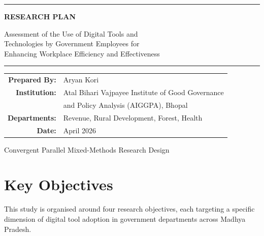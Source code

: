 \documentclass[12pt,a4paper]{article}
\begin{document}
\begin{titlepage}
\centering
\vspace*{3cm}

{\color{gold}\rule{0.6\textwidth}{2pt}}

\vspace{1cm}

{\Huge\bfseries\color{navy} RESEARCH PLAN}

\vspace{0.6cm}

{\Large\color{darkgray} Assessment of the Use of Digital Tools and\\[4pt] Technologies by Government Employees for\\[4pt] Enhancing Workplace Efficiency and Effectiveness}

\vspace{1cm}

{\color{gold}\rule{0.6\textwidth}{2pt}}

\vspace{2.5cm}

\begin{tabular}{r l}
\textbf{\color{navy}Prepared By:} & Aryan Kori \\[6pt]
\textbf{\color{navy}Institution:} & Atal Bihari Vajpayee Institute of Good Governance \\
& and Policy Analysis (AIGGPA), Bhopal \\[6pt]
\textbf{\color{navy}Departments:} & Revenue, Rural Development, Forest, Health \\[6pt]
\textbf{\color{navy}Date:} & April 2026 \\
\end{tabular}

\vfill
{\small\color{medgray} Convergent Parallel Mixed-Methods Research Design}
\end{titlepage}

\tableofcontents
\newpage

\section{Key Objectives}

This study is organised around four research objectives, each targeting a specific dimension of digital tool adoption in government departments across Madhya Pradesh.
\end{document}

